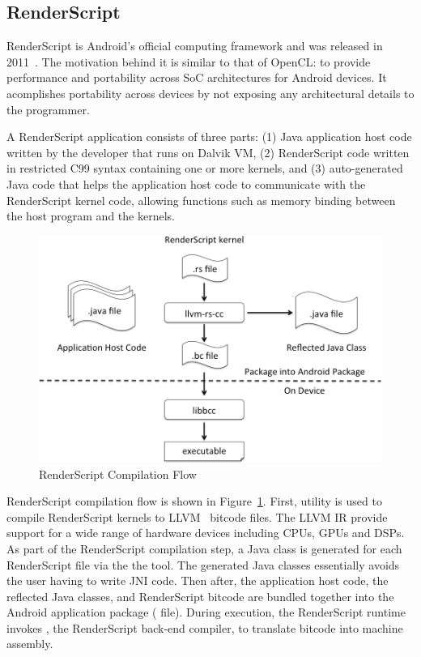 
\subsection{RenderScript}
RenderScript is Android's official computing framework and was released in 
2011~\cite{RenderScript}. The motivation behind it is similar to that of OpenCL: to provide
performance and portability across SoC architectures for Android devices.
It acomplishes portability across devices by not exposing any architectural details to the programmer.

A RenderScript application consists of three parts: (1) Java application host
code written by the developer that runs on Dalvik VM, (2) RenderScript code
written in restricted C99 syntax containing one or more kernels, and (3)
auto-generated Java code that helps the application host code to communicate with
the RenderScript kernel code, allowing functions such as memory binding between the
host program and the kernels.

\begin{figure}
\centering
\includegraphics[scale=0.28]{figs/renderscript-compile.png}
\caption{RenderScript Compilation Flow}
\label{fig:RSCompilation}
\centering
\end{figure}

RenderScript compilation flow is shown in Figure~\ref{fig:RSCompilation}.
First,  utility is used to compile RenderScript kernels to
LLVM~\cite{LLVM:CGO04} bitcode files. The LLVM IR provide support for a wide range of hardware
devices including CPUs, GPUs and DSPs. 
As part of the RenderScript compilation step, a Java class
is generated for each RenderScript file via the the  tool.
The generated Java classes essentially avoids the user having to write JNI code.
Then after, the application host code, the reflected Java classes, and RenderScript bitcode
are bundled together into the Android application package ( file).
During execution, the RenderScript
runtime invokes , the RenderScript back-end compiler, to translate
bitcode into machine assembly.


